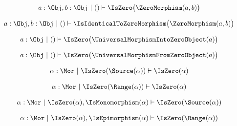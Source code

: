 \begin{sequent}
\begin{align*}
   a: \Obj, b: \Obj ~|~ () \vdash \IsZero \big( \ZeroMorphism( a, b ) \big)
\end{align*}
\end{sequent}

\begin{sequent}
\begin{align*}
   a: \Obj, b: \Obj ~|~ () \vdash \IsIdenticalToZeroMorphism \big( \ZeroMorphism( a, b ) \big)
\end{align*}
\end{sequent}

\begin{sequent}
\begin{align*}
   a: \Obj ~|~ () \vdash \IsZero \big( \UniversalMorphismIntoZeroObject( a ) \big)
\end{align*}
\end{sequent}

\begin{sequent}
\begin{align*}
   a: \Obj ~|~ () \vdash \IsZero \big( \UniversalMorphismFromZeroObject( a ) \big)
\end{align*}
\end{sequent}

\begin{sequent}
\begin{align*}
   \alpha: \Mor ~|~ \IsZero(\Source(\alpha)) \vdash \IsZero(\alpha)
\end{align*}
\end{sequent}

\begin{sequent}
\begin{align*}
   \alpha: \Mor ~|~ \IsZero(\Range(\alpha)) \vdash \IsZero(\alpha)
\end{align*}
\end{sequent}

\begin{sequent}
\begin{align*}
   \alpha: \Mor ~|~ \IsZero(\alpha), \IsMonomorphism(\alpha) \vdash \IsZero(\Source(\alpha))
\end{align*}
\end{sequent}

\begin{sequent}
\begin{align*}
   \alpha: \Mor ~|~ \IsZero(\alpha), \IsEpimorphism(\alpha) \vdash \IsZero(\Range(\alpha))
\end{align*}
\end{sequent}

